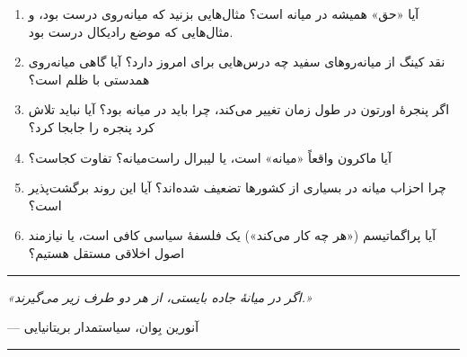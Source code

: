 \begin{tcolorbox}[
    enhanced,
    colback=centergreen!8,
    colframe=centergreen,
    boxrule=1.5pt,
    arc=5pt,
    fonttitle=\bfseries,
    title={\rl{❓ پرسش‌هایی برای تأمل و بحث}}
]
\begin{enumerate}
    \item آیا «حق» همیشه در میانه است؟ مثال‌هایی بزنید که میانه‌روی درست بود، و مثال‌هایی که موضع رادیکال درست بود.
    
    \item نقد کینگ از میانه‌روهای سفید چه درس‌هایی برای امروز دارد؟ آیا گاهی میانه‌روی همدستی با ظلم است؟
    
    \item اگر پنجرهٔ اورتون در طول زمان تغییر می‌کند، چرا باید در میانه بود؟ آیا نباید تلاش کرد پنجره را جابجا کرد؟
    
    \item آیا ماکرون واقعاً «میانه» است، یا لیبرال راست‌میانه؟ تفاوت کجاست؟
    
    \item چرا احزاب میانه در بسیاری از کشورها تضعیف شده‌اند؟ آیا این روند برگشت‌پذیر است؟
    
    \item آیا پراگماتیسم («هر چه کار می‌کند») یک فلسفهٔ سیاسی کافی است، یا نیازمند اصول اخلاقی مستقل هستیم؟
\end{enumerate}
\end{tcolorbox}

\vspace{10mm}
\begin{center}
\rule{0.6\textwidth}{1pt}

\vspace{3mm}
\textit{«اگر در میانهٔ جاده بایستی، از هر دو طرف زیر می‌گیرند.»}

\vspace{2mm}
--- آنورین بِوان، سیاستمدار بریتانیایی

\vspace{3mm}
\rule{0.6\textwidth}{1pt}
\end{center}